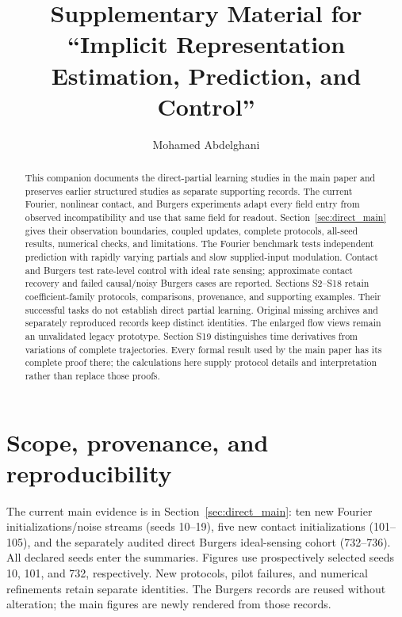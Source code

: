 \documentclass[journal]{IEEEtran}
\begin{document}
\title{Supplementary Material for\\``Implicit Representation Estimation, Prediction, and Control''}
\author{Mohamed Abdelghani}
\maketitle
\raggedbottom
\begin{abstract}
This companion documents the direct-partial learning studies in the main
paper and preserves earlier structured studies as separate supporting
records. The current Fourier, nonlinear contact, and Burgers experiments
adapt every field entry from observed incompatibility and use that same
field for readout. Section~\ref{sec:direct_main} gives their observation
boundaries, coupled updates, complete protocols, all-seed results, numerical
checks, and limitations. The Fourier benchmark tests independent prediction
with rapidly varying partials and slow supplied-input modulation. Contact
and Burgers test rate-level control with ideal rate sensing; approximate
contact recovery and failed causal/noisy Burgers cases are reported.
Sections S2--S18 retain coefficient-family protocols, comparisons, provenance,
and supporting examples. Their successful tasks do not establish direct
partial learning. Original missing archives and separately reproduced records
keep distinct identities. The enlarged flow views remain an unvalidated
legacy prototype. Section S19 distinguishes time derivatives from variations
of complete trajectories. Every formal result used by the main paper has
its complete proof there; the calculations here supply protocol details and
interpretation rather than replace those proofs.
\end{abstract}

\section{Scope, provenance, and reproducibility}
\label{sec:scope}
The current main evidence is in Section~\ref{sec:direct_main}: ten new
Fourier initializations/noise streams (seeds 10--19), five new contact
initializations (101--105), and the separately audited direct Burgers
ideal-sensing cohort (732--736). All declared seeds enter the summaries.
Figures use prospectively selected seeds 10, 101, and 732, respectively.
New protocols, pilot failures, and numerical refinements retain separate
identities. The Burgers records are reused without alteration; the main
figures are newly rendered from those records.
\end{document}
